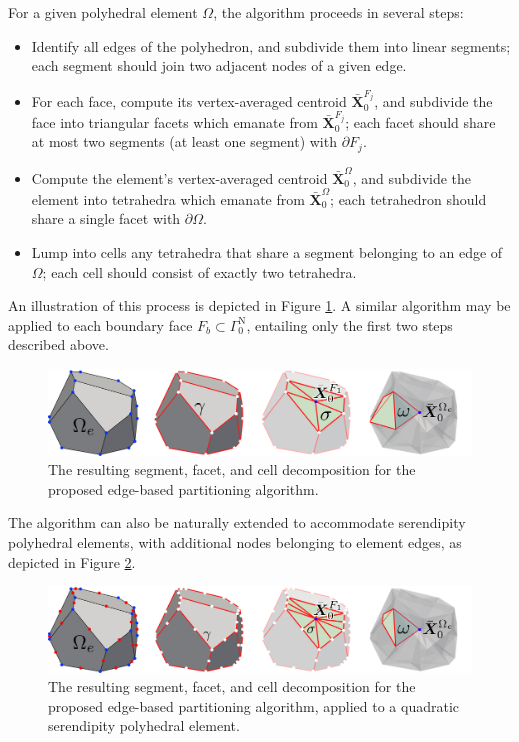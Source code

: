 	For a given polyhedral element $\Omega$, the algorithm proceeds in several steps:
	\begin{itemize}
		\item[1.)] Identify all edges of the polyhedron, and subdivide them into linear segments; each segment should join two adjacent nodes of a given edge.
		\item[2.)] For each face, compute its vertex-averaged centroid $\bar{\bm{X}}^{F_j}_0$, and subdivide the face into triangular facets which emanate from $\bar{\bm{X}}^{F_j}_0$; each facet should share at most two segments (at least one segment) with $\partial F_j$.
		\item[3a.)] Compute the element's vertex-averaged centroid $\bar{\bm{X}}^{\Omega}_0$, and subdivide the element into tetrahedra which emanate from $\bar{\bm{X}}^{\Omega}_0$; each tetrahedron should share a single facet with $\partial \Omega$.
		\item[3b.)] Lump into cells any tetrahedra that share a segment belonging to an edge of $\Omega$; each cell should consist of exactly two tetrahedra.
	\end{itemize}
	An illustration of this process is depicted in Figure \ref{fig:partitioning_algorithm}. A similar algorithm may be applied to each boundary face $F_b \subset \Gamma^{\mathrm N}_0$, entailing only the first two steps described above.
	\begin{figure} [!ht]
		\centering
		\includegraphics[width = 6.0in]{figures/partitioning_algorithm.pdf}
		\caption{The resulting segment, facet, and cell decomposition for the proposed edge-based partitioning algorithm.}
		\label{fig:partitioning_algorithm}
	\end{figure}
	
	The algorithm can also be naturally extended to accommodate serendipity polyhedral elements, with additional nodes belonging to element edges, as depicted in Figure \ref{fig:partitioning_algorithm_quadratic}.
	\begin{figure} [!ht]
		\centering
		\includegraphics[width = 6.0in]{figures/partitioning_algorithm_quadratic.pdf}
		\caption{The resulting segment, facet, and cell decomposition for the proposed edge-based partitioning algorithm, applied to a quadratic serendipity polyhedral element.}
		\label{fig:partitioning_algorithm_quadratic}
	\end{figure}
	
